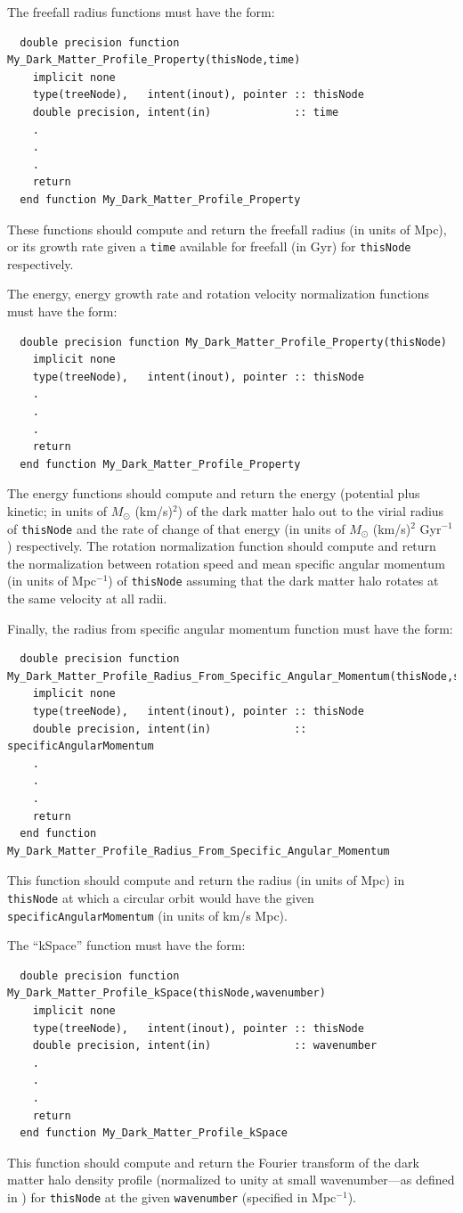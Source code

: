 The freefall radius functions must have the form:
\begin{verbatim}
  double precision function My_Dark_Matter_Profile_Property(thisNode,time)
    implicit none
    type(treeNode),   intent(inout), pointer :: thisNode
    double precision, intent(in)             :: time
    .
    .
    .
    return
  end function My_Dark_Matter_Profile_Property
\end{verbatim}
These functions should compute and return the freefall radius (in units of Mpc), or its growth rate given a {\tt time} available for freefall (in Gyr) for {\tt thisNode} respectively.

The energy, energy growth rate and rotation velocity normalization functions must have the form:
\begin{verbatim}
  double precision function My_Dark_Matter_Profile_Property(thisNode)
    implicit none
    type(treeNode),   intent(inout), pointer :: thisNode
    .
    .
    .
    return
  end function My_Dark_Matter_Profile_Property
\end{verbatim}
The energy functions should compute and return the energy (potential plus kinetic; in units of $M_\odot$ (km/s)$^2$) of the dark matter halo out to the virial radius of {\tt thisNode} and the rate of change of that energy (in units of $M_\odot$ (km/s)$^2$ Gyr$^{-1}$) respectively. The rotation normalization function should compute and return the normalization between rotation speed and mean specific angular momentum (in units of Mpc$^{-1}$) of {\tt thisNode} assuming that the dark matter halo rotates at the same velocity at all radii.

Finally, the radius from specific angular momentum function must have the form:
\begin{verbatim}
  double precision function My_Dark_Matter_Profile_Radius_From_Specific_Angular_Momentum(thisNode,specificAngularMomentum)
    implicit none
    type(treeNode),   intent(inout), pointer :: thisNode
    double precision, intent(in)             :: specificAngularMomentum
    .
    .
    .
    return
  end function My_Dark_Matter_Profile_Radius_From_Specific_Angular_Momentum
\end{verbatim}
This function should compute and return the radius (in units of Mpc) in {\tt thisNode} at which a circular orbit would have the given {\tt specificAngularMomentum} (in units of km/s Mpc).

The ``kSpace'' function must have the form:
\begin{verbatim}
  double precision function My_Dark_Matter_Profile_kSpace(thisNode,wavenumber)
    implicit none
    type(treeNode),   intent(inout), pointer :: thisNode
    double precision, intent(in)             :: wavenumber
    .
    .
    .
    return
  end function My_Dark_Matter_Profile_kSpace
\end{verbatim}
This function should compute and return the Fourier transform of the dark matter halo density profile (normalized to unity at small wavenumber---as defined in \citealt{cooray_halo_2002}) for {\tt thisNode} at the given {\tt wavenumber} (specified in Mpc$^{-1}$).


